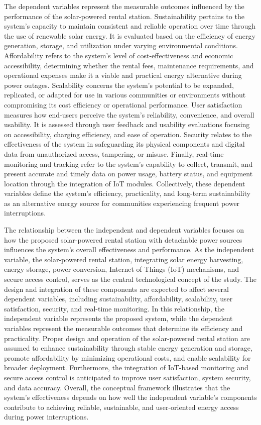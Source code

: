 {The dependent variables represent the measurable outcomes influenced by the performance of the solar-powered rental station. Sustainability pertains to the system’s capacity to maintain consistent and reliable operation over time through the use of renewable solar energy. It is evaluated based on the efficiency of energy generation, storage, and utilization under varying environmental conditions. Affordability refers to the system’s level of cost-effectiveness and economic accessibility, determining whether the rental fees, maintenance requirements, and operational expenses make it a viable and practical energy alternative during power outages. Scalability concerns the system’s potential to be expanded, replicated, or adapted for use in various communities or environments without compromising its cost efficiency or operational performance. User satisfaction measures how end-users perceive the system’s reliability, convenience, and overall usability. It is assessed through user feedback and usability evaluations focusing on accessibility, charging efficiency, and ease of operation. Security relates to the effectiveness of the system in safeguarding its physical components and digital data from unauthorized access, tampering, or misuse. Finally, real-time monitoring and tracking refer to the system’s capability to collect, transmit, and present accurate and timely data on power usage, battery status, and equipment location through the integration of IoT modules. Collectively, these dependent variables define the system’s efficiency, practicality, and long-term sustainability as an alternative energy source for communities experiencing frequent power interruptions.

The relationship between the independent and dependent variables focuses on how the proposed solar-powered rental station with detachable power sources influences the system’s overall effectiveness and performance. As the independent variable, the solar-powered rental station, integrating solar energy harvesting, energy storage, power conversion, Internet of Things (IoT) mechanisms, and secure access control, serves as the central technological concept of the study. The design and integration of these components are expected to affect several dependent variables, including sustainability, affordability, scalability, user satisfaction, security, and real-time monitoring. In this relationship, the independent variable represents the proposed system, while the dependent variables represent the measurable outcomes that determine its efficiency and practicality. Proper design and operation of the solar-powered rental station are assumed to enhance sustainability through stable energy generation and storage, promote affordability by minimizing operational costs, and enable scalability for broader deployment. Furthermore, the integration of IoT-based monitoring and secure access control is anticipated to improve user satisfaction, system security, and data accuracy. Overall, the conceptual framework illustrates that the system’s effectiveness depends on how well the independent variable’s components contribute to achieving reliable, sustainable, and user-oriented energy access during power interruptions.

}
